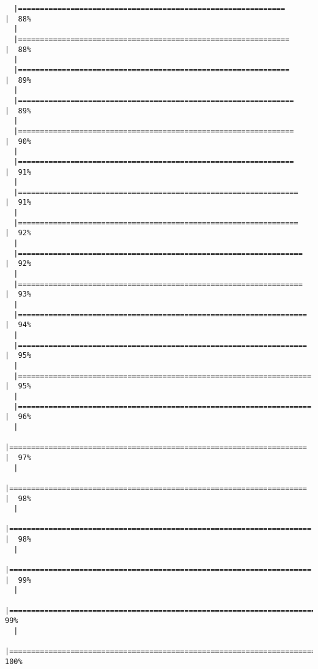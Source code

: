 \documentclass[
  letterpaper,
]{book}
\begin{document}
\begin{verbatim}
  |=============================================================         |  88%
  |                                                                            
  |==============================================================        |  88%
  |                                                                            
  |==============================================================        |  89%
  |                                                                            
  |===============================================================       |  89%
  |                                                                            
  |===============================================================       |  90%
  |                                                                            
  |===============================================================       |  91%
  |                                                                            
  |================================================================      |  91%
  |                                                                            
  |================================================================      |  92%
  |                                                                            
  |=================================================================     |  92%
  |                                                                            
  |=================================================================     |  93%
  |                                                                            
  |==================================================================    |  94%
  |                                                                            
  |==================================================================    |  95%
  |                                                                            
  |===================================================================   |  95%
  |                                                                            
  |===================================================================   |  96%
  |                                                                            
  |====================================================================  |  97%
  |                                                                            
  |====================================================================  |  98%
  |                                                                            
  |===================================================================== |  98%
  |                                                                            
  |===================================================================== |  99%
  |                                                                            
  |======================================================================|  99%
  |                                                                            
  |======================================================================| 100%
\end{verbatim}
\end{document}
